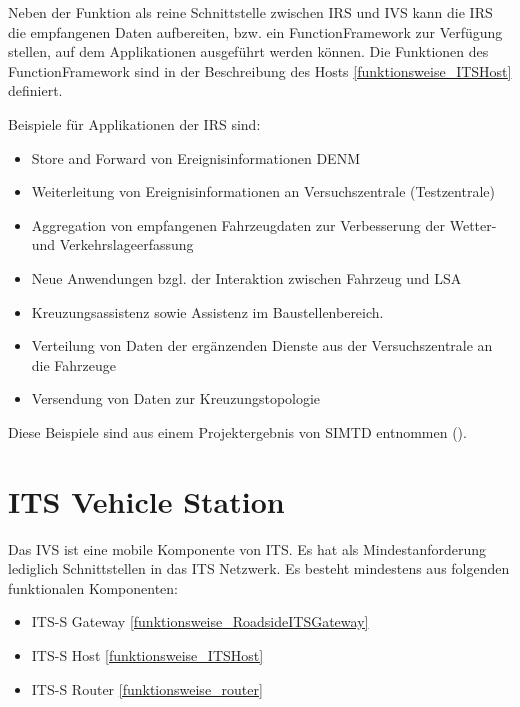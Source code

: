 Neben der Funktion als reine Schnittstelle zwischen \ac{IRS} und \ac{IVS} kann die \ac{IRS} die empfangenen Daten aufbereiten, bzw. ein FunctionFramework zur Verfügung stellen, auf dem Applikationen ausgeführt werden können. Die Funktionen des FunctionFramework sind in der Beschreibung des Hosts \ref{funktionsweise_ITSHost} definiert.  

Beispiele für Applikationen der \ac{IRS} sind:
\begin{itemize}
	\item Store and Forward von Ereignisinformationen \ac{DENM}
	\item Weiterleitung von Ereignisinformationen an Versuchszentrale (Testzentrale)
	\item Aggregation von empfangenen Fahrzeugdaten zur Verbesserung der Wetter- und Verkehrslageerfassung
	\item Neue Anwendungen bzgl. der Interaktion zwischen Fahrzeug und LSA
	\item  Kreuzungsassistenz sowie Assistenz im Baustellenbereich.
	\item Verteilung von Daten der ergänzenden Dienste aus der Versuchszentrale an die Fahrzeuge
	\item Versendung von Daten zur Kreuzungstopologie
\end{itemize}

Diese Beispiele sind aus einem Projektergebnis von \ac{SIMTD} entnommen (\cite{simtd-D12.1}). 



\section{ITS Vehicle Station}
Das \ac{IVS} ist eine mobile Komponente von \ac{ITS}. Es hat als Mindestanforderung lediglich Schnittstellen in das \ac{ITS} Netzwerk. Es besteht mindestens aus folgenden funktionalen Komponenten:
\begin{itemize}
	\item  \ac{ITS-S} Gateway \ref{funktionsweise_RoadsideITSGateway}
	\item \ac{ITS-S} Host \ref{funktionsweise_ITSHost}
	\item \ac{ITS-S} Router \ref{funktionsweise_router} 
\end{itemize}


